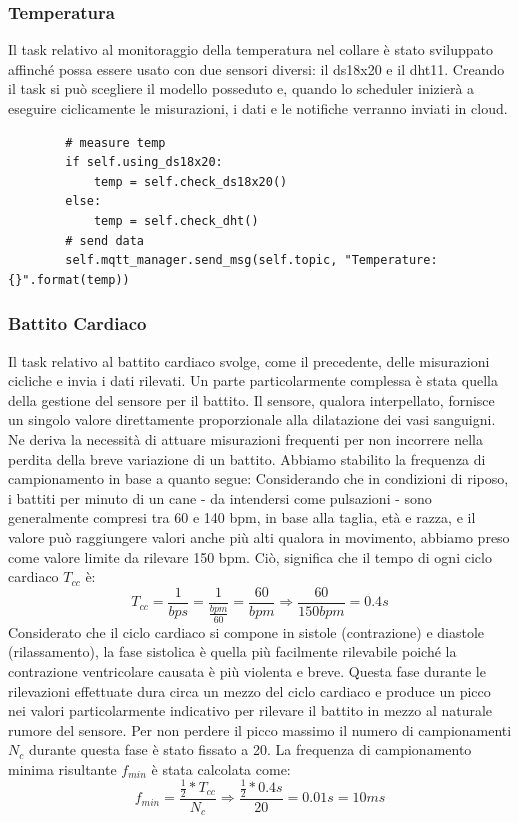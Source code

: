 \subsubsection{Temperatura}
Il task relativo al monitoraggio della temperatura nel collare è stato sviluppato affinché possa essere usato con due sensori diversi: il ds18x20 e il dht11. 
Creando il task si può scegliere il modello posseduto e, quando lo scheduler inizierà a eseguire ciclicamente le misurazioni, i dati e le notifiche verranno inviati in cloud.
    \begin{lstlisting} 
        # measure temp
        if self.using_ds18x20:
            temp = self.check_ds18x20()
        else:
            temp = self.check_dht()
        # send data
        self.mqtt_manager.send_msg(self.topic, "Temperature: {}".format(temp))
    \end{lstlisting}

\subsubsection{Battito Cardiaco}
Il task relativo al battito cardiaco svolge, come il precedente, delle misurazioni cicliche e invia i dati rilevati.
Un parte particolarmente complessa è stata quella della gestione del sensore per il battito. Il sensore, qualora interpellato, fornisce un singolo valore direttamente proporzionale alla dilatazione dei vasi sanguigni. Ne deriva la necessità di attuare misurazioni frequenti per non incorrere nella perdita della breve variazione di un battito. Abbiamo stabilito la frequenza di campionamento in base a quanto segue:
Considerando che in condizioni di riposo, i battiti per minuto di un cane - da intendersi come pulsazioni - sono generalmente compresi tra 60 e 140 bpm, in base alla taglia, età e razza, e il valore può raggiungere valori anche più alti qualora in movimento, abbiamo preso come valore limite da rilevare 150 bpm. Ciò, significa che il tempo di ogni ciclo cardiaco $T_{cc}$ è:
\begin{equation}
T_{cc} = \frac{1}{bps} = \frac{1}{\frac{bpm}{60}}= \frac{60}{bpm} \Rightarrow \frac{60}{150 bpm} = 0.4s
\end{equation}
Considerato che il ciclo cardiaco si compone in sistole (contrazione) e diastole (rilassamento), la fase sistolica è quella più facilmente rilevabile poiché la contrazione ventricolare causata è più violenta e breve. Questa fase durante le rilevazioni effettuate dura circa un mezzo del ciclo cardiaco e produce un picco nei valori particolarmente indicativo per rilevare il battito in mezzo al naturale rumore del sensore. Per non perdere il picco massimo il numero di campionamenti $N_{c}$ durante questa fase è stato fissato a 20. La frequenza di campionamento minima risultante $f_{min}$ è stata calcolata come: 
\begin{equation}
f_{min} = \frac{ \frac{1}{2} *  T_{cc} }{N_{c}} \Rightarrow  \frac{ \frac{1}{2} *  0.4s }{20} = 0.01s = 10 ms 
\end{equation}

